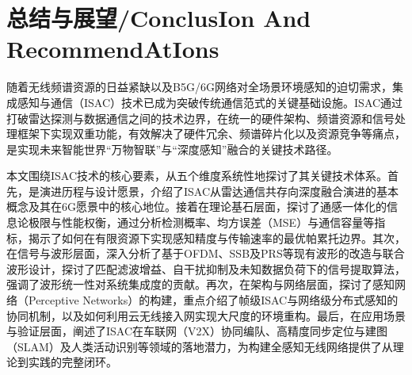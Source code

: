 \section{总结与展望/ConclusIon And RecommendAtIons}

随着无线频谱资源的日益紧缺以及B5G/6G网络对全场景环境感知的迫切需求，集成感知与通信（ISAC）技术已成为突破传统通信范式的关键基础设施。ISAC通过打破雷达探测与数据通信之间的技术边界，在统一的硬件架构、频谱资源和信号处理框架下实现双重功能，有效解决了硬件冗余、频谱碎片化以及资源竞争等痛点，是实现未来智能世界“万物智联”与“深度感知”融合的关键技术路径。

本文围绕ISAC技术的核心要素，从五个维度系统性地探讨了其关键技术体系。首先，是演进历程与设计愿景，介绍了ISAC从雷达通信共存向深度融合演进的基本概念及其在6G愿景中的核心地位。接着在理论基石层面，探讨了通感一体化的信息论极限与性能权衡，通过分析检测概率、均方误差（MSE）与通信容量等指标，揭示了如何在有限资源下实现感知精度与传输速率的最优帕累托边界。其次，在信号与波形层面，深入分析了基于OFDM、SSB及PRS等现有波形的改造与联合波形设计，探讨了匹配滤波增益、自干扰抑制及未知数据负荷下的信号提取算法，强调了波形统一性对系统集成度的贡献。再次，在架构与网络层面，探讨了感知网络（Perceptive Networks）的构建，重点介绍了帧级ISAC与网络级分布式感知的协同机制，以及如何利用云无线接入网实现大尺度的环境重构。最后，在应用场景与验证层面，阐述了ISAC在车联网（V2X）协同编队、高精度同步定位与建图（SLAM）及人类活动识别等领域的落地潜力，为构建全感知无线网络提供了从理论到实践的完整闭环。

